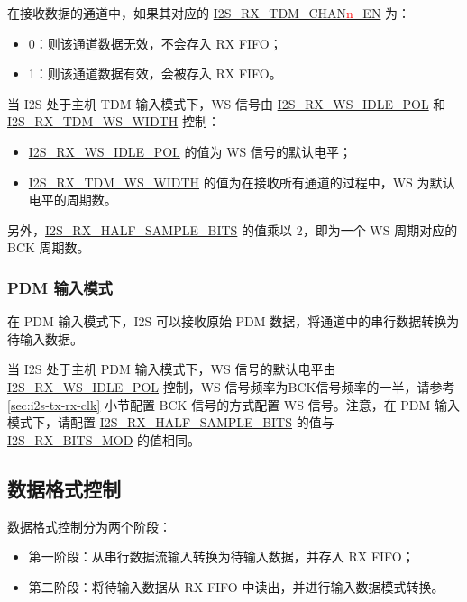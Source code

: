 \documentclass[main\_\_CN.tex]{subfiles}
\begin{document}
在接收数据的通道中，如果其对应的 \hyperref[fielddesc:I2STXTDMCHAN0EN]{I2S\_RX\_TDM\_CHAN{\textcolor{red}{n}}\_EN} 为：
\begin{itemize}
    \item 0：则该通道数据无效，不会存入 RX FIFO；
    \item 1：则该通道数据有效，会被存入 RX FIFO。
\end{itemize}
当 I2S 处于主机 TDM 输入模式下，WS 信号由 \hyperref[fielddesc:I2SRXWSIDLEPOL]{I2S\_RX\_WS\_IDLE\_POL} 和 \hyperref[fielddesc:I2SRXTDMWSWIDTH]{I2S\_RX\_TDM\_WS\_WIDTH} 控制：
\begin{itemize}
    \item \hyperref[fielddesc:I2SRXWSIDLEPOL]{I2S\_RX\_WS\_IDLE\_POL} 的值为 WS 信号的默认电平；
    \item \hyperref[fielddesc:I2SRXTDMWSWIDTH]{I2S\_RX\_TDM\_WS\_WIDTH} 的值为在接收所有通道的过程中，WS 为默认电平的周期数。
\end{itemize}
另外，\hyperref[fielddesc:I2SRXHALFSAMPLEBITS]{I2S\_RX\_HALF\_SAMPLE\_BITS} 的值乘以 2，即为一个 WS 周期对应的 BCK 周期数。

\subsubsection{PDM 输入模式} 

在 PDM 输入模式下，I2S 可以接收原始 PDM 数据，将通道中的串行数据转换为待输入数据。

当 I2S 处于主机 PDM 输入模式下，WS 信号的默认电平由 \hyperref[fielddesc:I2SRXWSIDLEPOL]{I2S\_RX\_WS\_IDLE\_POL} 控制，WS 信号频率为BCK信号频率的一半，请参考 \ref{sec:i2s-tx-rx-clk} 小节配置 BCK 信号的方式配置 WS 信号。注意，在 PDM 输入模式下，请配置 \hyperref[fielddesc:I2SRXHALFSAMPLEBITS]{I2S\_RX\_HALF\_SAMPLE\_BITS} 的值与 \hyperref[fielddesc:I2SRXBITSMOD]{I2S\_RX\_BITS\_MOD} 的值相同。

\subsection{数据格式控制}

数据格式控制分为两个阶段：

\begin{itemize}
    \item 第一阶段：从串行数据流输入转换为待输入数据，并存入 RX FIFO；
    \item 第二阶段：将待输入数据从 RX FIFO 中读出，并进行输入数据模式转换。
\end{itemize}
\end{document}

